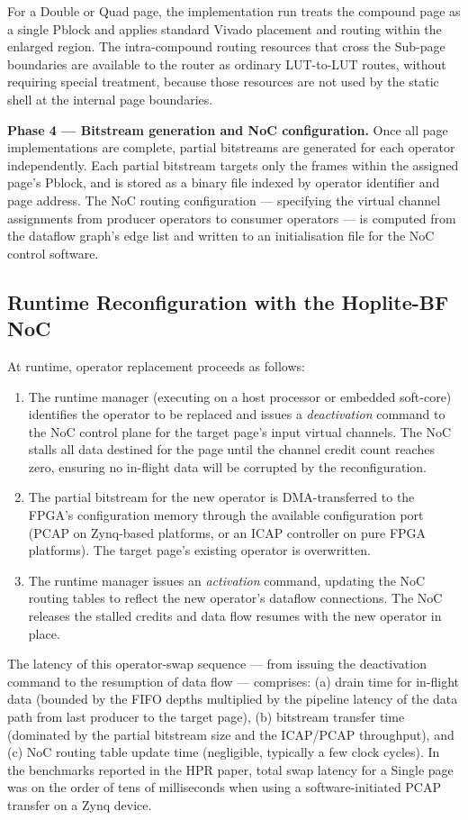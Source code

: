 For a Double or Quad page, the implementation run treats the compound page as a single Pblock and applies standard Vivado placement and routing within the enlarged region. The intra-compound routing resources that cross the Sub-page boundaries are available to the router as ordinary LUT-to-LUT routes, without requiring special treatment, because those resources are not used by the static shell at the internal page boundaries.

\textbf{Phase 4 — Bitstream generation and NoC configuration.} Once all page implementations are complete, partial bitstreams are generated for each operator independently. Each partial bitstream targets only the frames within the assigned page's Pblock, and is stored as a binary file indexed by operator identifier and page address. The NoC routing configuration — specifying the virtual channel assignments from producer operators to consumer operators — is computed from the dataflow graph's edge list and written to an initialisation file for the NoC control software.

\subsection{Runtime Reconfiguration with the Hoplite-BF NoC}

At runtime, operator replacement proceeds as follows:

\begin{enumerate}
  \item The runtime manager (executing on a host processor or embedded soft-core) identifies the operator to be replaced and issues a \textit{deactivation} command to the NoC control plane for the target page's input virtual channels. The NoC stalls all data destined for the page until the channel credit count reaches zero, ensuring no in-flight data will be corrupted by the reconfiguration.
  \item The partial bitstream for the new operator is DMA-transferred to the FPGA's configuration memory through the available configuration port (PCAP on Zynq-based platforms, or an ICAP controller on pure FPGA platforms). The target page's existing operator is overwritten.
  \item The runtime manager issues an \textit{activation} command, updating the NoC routing tables to reflect the new operator's dataflow connections. The NoC releases the stalled credits and data flow resumes with the new operator in place.
\end{enumerate}
The latency of this operator-swap sequence — from issuing the deactivation command to the resumption of data flow — comprises: (a) drain time for in-flight data (bounded by the FIFO depths multiplied by the pipeline latency of the data path from last producer to the target page), (b) bitstream transfer time (dominated by the partial bitstream size and the ICAP/PCAP throughput), and (c) NoC routing table update time (negligible, typically a few clock cycles). In the benchmarks reported in the HPR paper, total swap latency for a Single page was on the order of tens of milliseconds when using a software-initiated PCAP transfer on a Zynq device.

